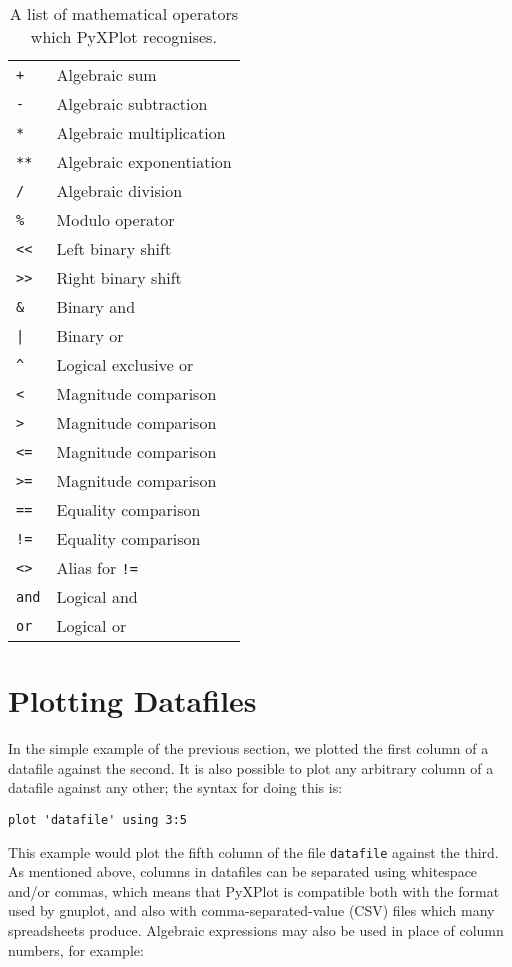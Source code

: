 \documentclass[a4paper,onecolumn,11pt]{book}
\begin{document}
\begin{table}
\begin{longtable}{|lp{8cm}|}
\hline
\texttt{+} & Algebraic sum \\
\texttt{-} & Algebraic subtraction \\
\texttt{*} & Algebraic multiplication \\
\texttt{**} & Algebraic exponentiation \\
\texttt{/} & Algebraic division \\
\texttt{\%} & Modulo operator \\
\texttt{<<} & Left binary shift \\
\texttt{>>} & Right binary shift \\
\texttt{\&} & Binary and \\
\texttt{|} & Binary or \\
\texttt{\^{}} & Logical exclusive or \\
\texttt{<} & Magnitude comparison \\
\texttt{>} & Magnitude comparison \\
\texttt{<=} & Magnitude comparison \\
\texttt{>=} & Magnitude comparison \\
\texttt{==} & Equality comparison \\
\texttt{!=} & Equality comparison \\
\texttt{<>} & Alias for \texttt{!=} \\
\texttt{and} & Logical and \\
\texttt{or} & Logical or \\
\hline
\end{longtable}
\caption{A list of mathematical operators which PyXPlot recognises.}
\label{operators_table}
\end{table}

\section{Plotting Datafiles}
\label{plot_datafiles}

In the simple example of the previous section, we plotted the first column of a
datafile against the second. It is also possible to plot any arbitrary column
of a datafile against any other; the syntax for doing this is:

\begin{verbatim}
plot 'datafile' using 3:5
\end{verbatim}

\noindent This example would plot the fifth column of the file
\texttt{datafile} against the third. As mentioned above, columns in datafiles
can be separated using whitespace and/or commas, which means that PyXPlot is
compatible both with the format used by gnuplot, and also with
comma-separated-value (CSV) files which many
spreadsheets produce. Algebraic
expressions may also be used in place of column numbers, for example:
\end{document}
